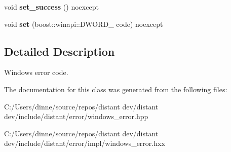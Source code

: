 \begin{DoxyCompactItemize}
\mbox{\label{classdistant_1_1error_1_1windows__error__code_ac67c1fc88b2acdfd61d36d424c513de4}} 
void {\bfseries set\+\_\+success} () noexcept
\item 
\mbox{\label{classdistant_1_1error_1_1windows__error__code_a6a6337d6d1605ebc983330c8e3874747}} 
void {\bfseries set} (boost\+::winapi\+::\+D\+W\+O\+R\+D\+\_\+ code) noexcept
\end{DoxyCompactItemize}


\subsection{Detailed Description}
Windows error code. 

The documentation for this class was generated from the following files\+:\begin{DoxyCompactItemize}
\item 
C\+:/\+Users/dinne/source/repos/distant dev/distant dev/include/distant/error/windows\+\_\+error.\+hpp\item 
C\+:/\+Users/dinne/source/repos/distant dev/distant dev/include/distant/error/impl/windows\+\_\+error.\+hxx\end{DoxyCompactItemize}
